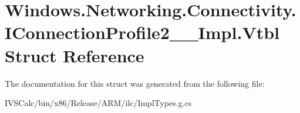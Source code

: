 \hypertarget{struct_windows_1_1_networking_1_1_connectivity_1_1_i_connection_profile2_____impl_1_1_vtbl}{}\section{Windows.\+Networking.\+Connectivity.\+I\+Connection\+Profile2\+\_\+\+\_\+\+Impl.\+Vtbl Struct Reference}
\label{struct_windows_1_1_networking_1_1_connectivity_1_1_i_connection_profile2_____impl_1_1_vtbl}


The documentation for this struct was generated from the following file\+:\begin{DoxyCompactItemize}
\item 
I\+V\+S\+Calc/bin/x86/\+Release/\+A\+R\+M/ilc/Impl\+Types.\+g.\+cs\end{DoxyCompactItemize}
